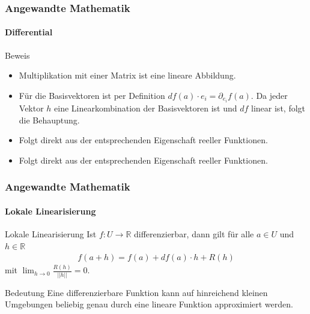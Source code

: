 \documentclass{beamer}
\begin{document}
\begin{frame}
    \frametitle{Angewandte Mathematik}
\framesubtitle{Differential}
    \begin{block}{Beweis}
\begin{itemize}
\item  Multiplikation mit einer Matrix ist eine lineare Abbildung.
\item Für die Basisvektoren ist per Definition $df(a)  \cdot e_i = \partial_{e_i} f(a)$. Da jeder Vektor $h$ eine Linearkombination der Basisvektoren ist und $df$ linear ist, folgt die Behauptung.
\item Folgt direkt aus der entsprechenden Eigenschaft reeller Funktionen.
\item Folgt direkt aus der entsprechenden Eigenschaft reeller Funktionen.
\end{itemize}
\end{block}
 \end{frame}



\begin{frame}
    \frametitle{Angewandte Mathematik}
\framesubtitle{Lokale Linearisierung}
    \begin{block}{Lokale Linearisierung}
Ist  $f: U \to \mathbb{R}$ differenzierbar, dann gilt für alle $a \in U$ und $h \in \mathbb{R}$ 
\begin{align*}
f(a + h)  =  f(a)  +  df(a) \cdot h + R(h) 
\end{align*}
mit   $\lim_{h \to 0} \frac{R(h)}{ ||h||} = 0$.
\end{block}
    \begin{block}{Bedeutung}
Eine differenzierbare Funktion kann  auf hinreichend kleinen Umgebungen 
beliebig genau durch eine lineare Funktion approximiert werden. 
\end{block}
 \end{frame}
\end{document}
